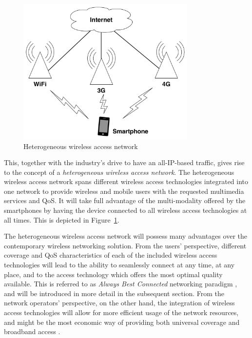 \begin{figure}[t]
    \centering
    \includegraphics[width=3.5in]{Intelligent/Figures/heterogeneous}
    \caption{Heterogeneous wireless access network}
    \label{fig:heterogeneous_intelligent}
\end{figure}

This, together with the industry's drive to have an all-IP-based traffic, gives rise to the concept of a \emph{heterogeneous wireless access network}. The heterogeneous wireless access network spans different wireless access technologies integrated into one network to provide wireless and mobile users with the requested multimedia services and QoS. It will take full advantage of the multi-modality offered by the smartphones by having the device connected to all wireless access technologies at all times. This is depicted in Figure~\ref{fig:heterogeneous_intelligent}.

The heterogeneous wireless access network will possess many advantages over the contemporary wireless networking solution. From the users' perspective, different coverage and QoS characteristics of each of the included wireless access technologies will lead to the ability to seamlessly connect at any time, at any place, and to the access technology which offers the most optimal quality available. This is referred to as \emph{Always Best Connected} networking paradigm \cite{ABC03}, and will be introduced in more detail in the subsequent section. From the network operators' perspective, on the other hand, the integration of wireless access technologies will allow for more efficient usage of the network resources, and might be the most economic way of providing both universal coverage and broadband access \cite{HossainBeaubrun09}.


